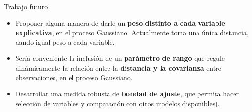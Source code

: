 \documentclass{beamer}
\begin{document}
\begin{frame}{Trabajo futuro}
    \begin{itemize}
        \setlength\itemsep{2em}
        \item {Proponer alguna manera de darle un \textbf{peso distinto a cada variable explicativa}, en el proceso Gaussiano. Actualmente toma una \'unica distancia, dando igual peso a cada variable.}
        \item {Ser\'ia conveniente la inclusi\'on de un \textbf{par\'ametro de rango} que regule din\'amicamente la relaci\'on entre la \textbf{distancia y la covarianza} entre observaciones, en el proceso Gaussiano.}
        \item {Desarrollar una medida robusta de \textbf{bondad de ajuste}, que permita hacer selecci\'on de variables y comparaci\'on con otros modelos disponibles). }
        
    \end{itemize}
\end{frame}

\begin{frame}
  \titlepage
\end{frame}
\end{document}

